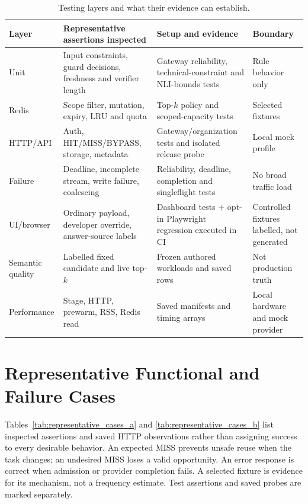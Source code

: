 \begin{table}[htbp]\centering\small
\caption{Testing layers and what their evidence can establish.}\label{tab:test_layers}
\begin{tabular}{p{2.2cm}p{4.0cm}p{4.2cm}p{2.2cm}}\toprule
Layer & Representative assertions inspected & Setup and evidence & Boundary \\\midrule
Unit & Input constraints, guard decisions, freshness and verifier length & Gateway reliability, technical-constraint and NLI-bounds tests & Rule behavior only \\
Redis & Scope filter, mutation, expiry, LRU and quota & Top-$k$ policy and scoped-capacity tests & Selected fixtures \\
HTTP/API & Auth, HIT/MISS/BYPASS, storage, metadata & Gateway/organization tests and isolated release probe & Local mock profile \\
Failure & Deadline, incomplete stream, write failure, coalescing & Reliability, deadline, completion and singleflight tests & No broad traffic load \\
UI/browser & Ordinary payload, developer override, answer-source labels & Dashboard tests + opt-in Playwright regression executed in CI & Controlled fixtures labelled, not generated \\
Semantic quality & Labelled fixed candidate and live top-$k$ & Frozen authored workloads and saved rows & Not production truth \\
Performance & Stage, HTTP, prewarm, RSS, Redis read & Saved manifests and timing arrays & Local hardware and mock provider \\\bottomrule
\end{tabular}
\end{table}

\section{Representative Functional and Failure Cases}
Tables~\ref{tab:representative_cases_a} and \ref{tab:representative_cases_b} list inspected assertions and saved HTTP observations rather than assigning success to every desirable behavior. An expected MISS prevents unsafe reuse when the task changes; an undesired MISS loses a valid opportunity. An error response is correct when admission or provider completion fails. A selected fixture is evidence for its mechanism, not a frequency estimate. Test assertions and saved probes are marked separately.

